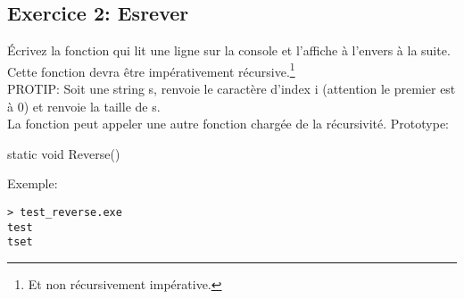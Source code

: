 \subsection{Exercice 2: Esrever}

Écrivez la fonction  qui lit une ligne sur la console et l'affiche à
l'envers à la suite.\\
Cette fonction devra être impérativement récursive.\footnote{Et non
récursivement impérative.}\\
PROTIP: Soit une string s,  renvoie le caractère d'index i (attention le
premier est à 0) et  renvoie la taille de s.\\
La fonction  peut appeler une autre fonction chargée de la récursivité.
\newpage
Prototype:
\begin{code}
static void Reverse()
\end{code}

Exemple:
\begin{verbatim}
> test_reverse.exe
test
tset
\end{verbatim}
